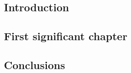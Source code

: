 \documentclass[a4paper,twoside,openany,12pt]{memoir}
\begin{document}
\titlepage
\frontmatter
% 
% 
% 
% 
\tableofcontents
\listoffigures
\printglossary[type=\acronymtype]
\mainmatter

\begin{refsection}
\chapter{\label{ch1}Introduction} 

\printbibliography[title={References}]
\end{refsection}


\begin{refsection}
\chapter{\label{ch2} First significant chapter} 




\printbibliography[title={References}]
\end{refsection}

\begin{refsection}
\chapter{\label{conclusions}Conclusions} 

\printbibliography[title={References}]
\end{refsection}



% 

\clearpage
\printglossary
\end{document}
